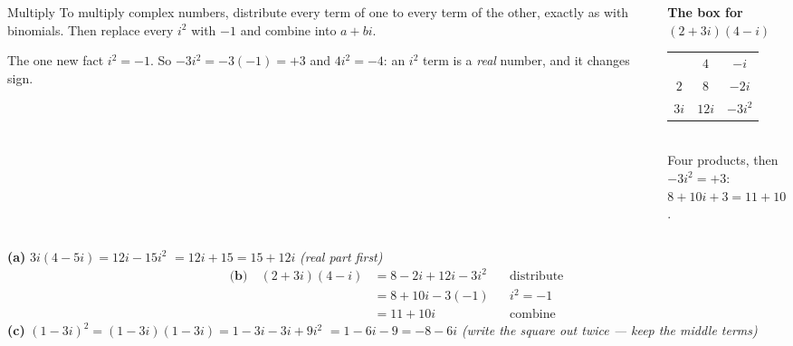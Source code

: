 \documentclass[aspectratio=169, 11pt]{beamer}
\begin{document}
\begin{frame}[t, plain]
  \begin{columns}[T]
    \begin{column}{0.56\textwidth}
      \begin{block}{Multiply}
        To multiply complex numbers, distribute every term of one to every term of the other,
        exactly as with binomials. Then replace every $i^2$ with $-1$ and combine into
        $a+bi$.
      \end{block}
      \vspace{2pt}
      \begin{block}{The one new fact}
        $i^2=-1$. So $-3i^2=-3(-1)=+3$ and $4i^2=-4$: an $i^2$ term is a \emph{real} number,
        and it changes sign.
      \end{block}
    \end{column}
    \begin{column}{0.4\textwidth}
      \centering
      \textbf{The box for $(2+3i)(4-i)$}\\[6pt]
      \renewcommand{\arraystretch}{1.7}
      \begin{tabular}{c|c|c|}
        \multicolumn{1}{c}{} & \multicolumn{1}{c}{$4$} & \multicolumn{1}{c}{$-i$} \\
        \cline{2-3}
        $2$  & $8$   & $-2i$ \\ \cline{2-3}
        $3i$ & $12i$ & $-3i^2$ \\ \cline{2-3}
      \end{tabular}\\[6pt]
      {\scriptsize Four products, then $-3i^2=+3$: \\ $8+10i+3=11+10i$.}
    \end{column}
  \end{columns}
\end{frame}

\begin{frame}[t, plain]
  \textbf{(a)} $3i(4-5i)=12i-15i^2$ \pause $=12i+15=15+12i$ \quad \emph{(real part first)}
  \pause
  \[
  \begin{aligned}
    \textbf{(b)}\quad (2+3i)(4-i) &= 8-2i+12i-3i^2 && \text{distribute} \\
                                  &= 8+10i-3(-1)   && i^2=-1 \\
                                  &= 11+10i        && \text{combine}
  \end{aligned}
  \]
  \pause
  \textbf{(c)} $(1-3i)^2=(1-3i)(1-3i)=1-3i-3i+9i^2$ \pause $=1-6i-9=-8-6i$ \quad
  \emph{(write the square out twice --- keep the middle terms)}
\end{frame}
\end{document}
